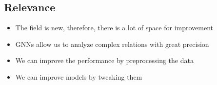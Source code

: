 \subsection{Relevance}
\begin{frame}{\subsecname}
   \begin{itemize}
      \item The field is new, therefore, there is a lot of space for improvement
      \item GNNs allow us to analyze complex relations with great precision
      \item We can improve the performance by preprocessing the data
      \item We can improve models by tweaking them
   \end{itemize}
\end{frame}
